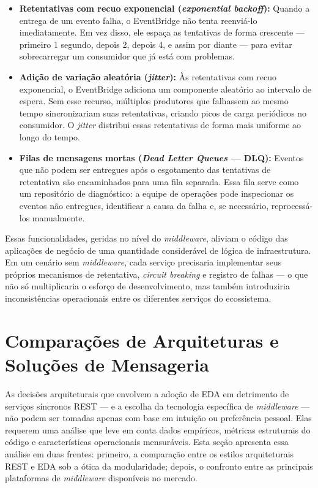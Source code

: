 \documentclass[12pt, a4paper]{article}
\begin{document}
\begin{itemize}
    \item \textbf{Retentativas com recuo exponencial (\textit{exponential backoff}):} Quando a entrega de um evento falha, o EventBridge não tenta reenviá-lo imediatamente. Em vez disso, ele espaça as tentativas de forma crescente --- primeiro 1 segundo, depois 2, depois 4, e assim por diante --- para evitar sobrecarregar um consumidor que já está com problemas.

    \item \textbf{Adição de variação aleatória (\textit{jitter}):} Às retentativas com recuo exponencial, o EventBridge adiciona um componente aleatório ao intervalo de espera. Sem esse recurso, múltiplos produtores que falhassem ao mesmo tempo sincronizariam suas retentativas, criando picos de carga periódicos no consumidor. O \textit{jitter} distribui essas retentativas de forma mais uniforme ao longo do tempo.

    \item \textbf{Filas de mensagens mortas (\textit{Dead Letter Queues} --- DLQ):} Eventos que não podem ser entregues após o esgotamento das tentativas de retentativa são encaminhados para uma fila separada. Essa fila serve como um repositório de diagnóstico: a equipe de operações pode inspecionar os eventos não entregues, identificar a causa da falha e, se necessário, reprocessá-los manualmente.
\end{itemize}

Essas funcionalidades, geridas no nível do \textit{middleware}, aliviam o código das aplicações de negócio de uma quantidade considerável de lógica de infraestrutura. Em um cenário sem \textit{middleware}, cada serviço precisaria implementar seus próprios mecanismos de retentativa, \textit{circuit breaking} e registro de falhas --- o que não só multiplicaria o esforço de desenvolvimento, mas também introduziria inconsistências operacionais entre os diferentes serviços do ecossistema.


\section{Comparações de Arquiteturas e Soluções de Mensageria}

As decisões arquiteturais que envolvem a adoção de EDA em detrimento de serviços síncronos REST --- e a escolha da tecnologia específica de \textit{middleware} --- não podem ser tomadas apenas com base em intuição ou preferência pessoal. Elas requerem uma análise que leve em conta dados empíricos, métricas estruturais do código e características operacionais mensuráveis. Esta seção apresenta essa análise em duas frentes: primeiro, a comparação entre os estilos arquiteturais REST e EDA sob a ótica da modularidade; depois, o confronto entre as principais plataformas de \textit{middleware} disponíveis no mercado.
\end{document}

